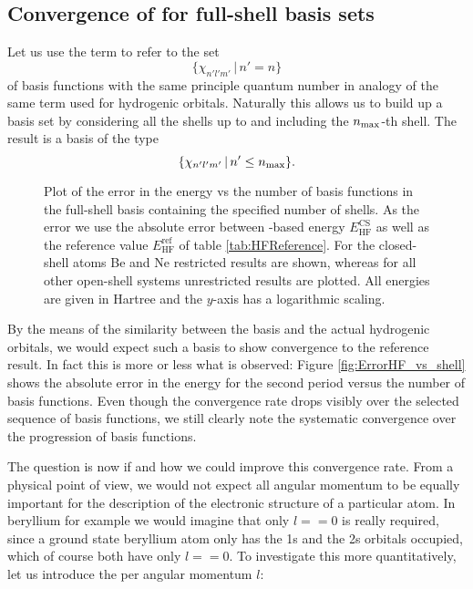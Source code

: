 \subsection{Convergence of \HF for full-shell \CS basis sets}
Let us use the term  to refer to the set
\[ \{ \chi_{n'l'm'} \, | \, n' = n \} \]
of \CS basis functions with the same principle quantum number
in analogy of the same term used for hydrogenic orbitals.
Naturally this allows us to build up a \CS basis set by considering
all the shells up to and including the $n_\text{max}$-th shell.
The result is a  \CS basis of the type
\[ \{ \chi_{n'l'm'} \, | \, n' \leq n_\text{max} \}. \]

\begin{figure}
	\centering
	\caption{
		Plot of the error in the \HF energy vs the number of basis
		functions in the full-shell \CS basis containing
		the specified number of shells.
		As the error we use the absolute error between \CS-based \HF energy
		$E_\text{HF}^\text{CS}$ as well as the reference value
		$E_\text{HF}^\text{ref}$ of table \vref{tab:HFReference}.
		For the closed-shell atoms Be and Ne restricted \HF results are shown,
		whereas for all other open-shell systems unrestricted \HF results
		are plotted.
		All energies are given in Hartree
		and the $y$-axis has a logarithmic scaling.
}
	\label{fig:ErrorHF_vs_shell}
\end{figure}
By the means of the similarity between the \CS basis and the actual
hydrogenic orbitals,
we would expect such a basis to show convergence to the reference \HF result.
In fact this is more or less what is observed:
Figure \vref{fig:ErrorHF_vs_shell} shows the absolute error in the \HF energy
for the second period versus the number of basis functions.
Even though the convergence rate drops visibly
over the selected sequence of basis functions,
we still clearly note the systematic convergence over the progression
of basis functions.

The question is now if and how we could improve this convergence rate.
From a physical point of view,
we would not expect all angular momentum to be equally important
for the description of the electronic structure of a particular atom.
In beryllium for example we would imagine that only $l == 0$ is really required,
since a ground state beryllium atom only has the 1s and the 2s orbitals occupied,
which of course both have only $l == 0$.
To investigate this more quantitatively,
let us introduce the 
per angular momentum $l$:

